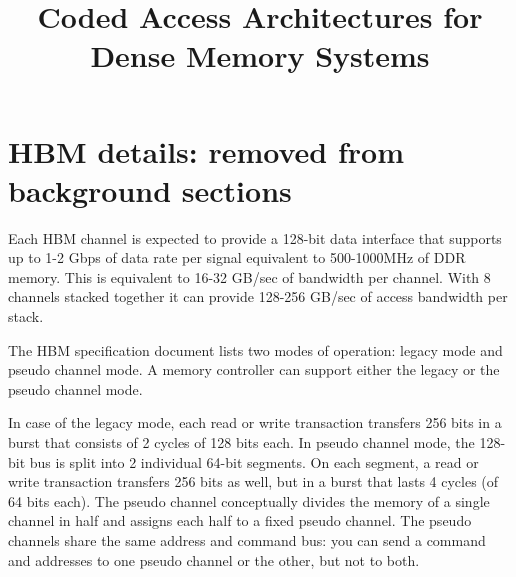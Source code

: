 \documentclass{sig-alternate}
\title{Coded Access Architectures for Dense Memory Systems}
\author{}
\newcommand*\Matt[1]{{\color{red}{\textbf{[MATT:~#1]}}}}
\begin{document}
\maketitle
\thispagestyle{firstpage}
\pagestyle{plain}


















%
\section{HBM details: removed from background sections}
\Matt{Move this to appendix}
Each HBM channel is expected to provide a 128-bit data interface that supports up to 1-2 Gbps of data rate per signal equivalent to 500-1000MHz of DDR memory. This is equivalent to 16-32 GB/sec of bandwidth per channel. With 8 channels stacked together it can provide 128-256 GB/sec of access bandwidth per stack. 

The HBM specification document lists two modes of operation: legacy mode and pseudo channel mode. A memory controller can support either the legacy or the pseudo channel mode. 

In case of the legacy mode, each read or write transaction transfers 256 bits in a burst that consists of 2 cycles of 128 bits each. In pseudo channel mode, the 128-bit bus is split into 2 individual 64-bit segments. On each segment, a read or write transaction transfers 256 bits as well, but in a burst that lasts 4 cycles (of 64 bits each). The pseudo channel conceptually divides the memory of a single channel in half and assigns each half to a fixed pseudo channel. The pseudo channels share the same address and command bus: you can send a command and addresses to one pseudo channel or the other, but not to both.
\end{document}
